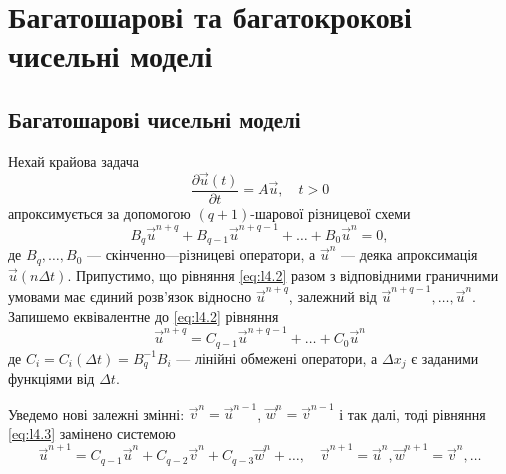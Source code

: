 \chapter{Багатошарові та багатокрокові чисельні моделі}


\section{Багатошарові чисельні моделі}

Нехай крайова задача
\begin{equation}
    \label{eq:l4.1}
    \frac{\partial \vec u(t)}{\partial t} = A \vec u, \quad t > 0
\end{equation}
апроксимується за допомогою $(q+1)$-шарової різницевої схеми
\begin{equation}
    \label{eq:l4.2}
    B_q \vec u^{n + q} + B_{q - 1} \vec u^{n + q - 1} + \ldots + B_0 \vec u^n = 0,
\end{equation}
де $B_q, \ldots, B_0$ --- скінченно---різницеві оператори, а $\vec u^n$ --- деяка апроксимація $\vec u(n \Delta t)$. Припустимо, що рівняння \eqref{eq:l4.2} разом з відповідними граничними умовами має єдиний розв'язок відносно $\vec u^{n + q}$, залежний від $\vec u^{n + q - 1}, \ldots, \vec u^n$. Запишемо еквівалентне до \eqref{eq:l4.2} рівняння 
\begin{equation}
    \label{eq:l4.3}
    \vec u^{n + q} = C_{q - 1} \vec u^{n + q - 1} + \ldots + C_0 \vec u^n
\end{equation}
де $C_i = C_i(\Delta t) = B_q^{-1} B_i$ --- лінійні обмежені оператори, а $\Delta x_j$ є заданими функціями від $\Delta t$. \medskip

Уведемо нові залежні змінні: $\vec v^n = \vec u^{n - 1}$, $\vec w^n = \vec v^{n - 1}$ і так далі, тоді рівняння \eqref{eq:l4.3} замінено системою 
\begin{equation}
    \label{eq:l4.4}
    \vec u^{n + 1} = C_{q - 1} \vec u^n + C_{q - 2} \vec v^n + C_{q - 3} \vec w^n + \ldots, \quad \vec v^{n + 1} = \vec u^n, \vec w^{n + 1} = \vec v^n, \ldots
\end{equation}

